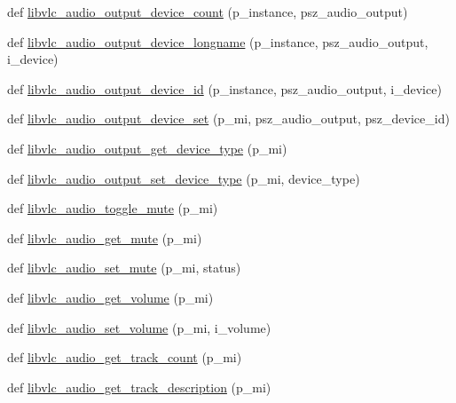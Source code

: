 \begin{DoxyCompactItemize}
def \hyperlink{namespacesrc_1_1lib_1_1vlc_a1e3a4ab8dbece4487c291bbee2345c6c}{libvlc\+\_\+audio\+\_\+output\+\_\+device\+\_\+count} (p\+\_\+instance, psz\+\_\+audio\+\_\+output)
\item 
def \hyperlink{namespacesrc_1_1lib_1_1vlc_add2e127d4a454dd4ab58cc9622f915f6}{libvlc\+\_\+audio\+\_\+output\+\_\+device\+\_\+longname} (p\+\_\+instance, psz\+\_\+audio\+\_\+output, i\+\_\+device)
\item 
def \hyperlink{namespacesrc_1_1lib_1_1vlc_ae3beaf2e0dd800587826423f0abc013e}{libvlc\+\_\+audio\+\_\+output\+\_\+device\+\_\+id} (p\+\_\+instance, psz\+\_\+audio\+\_\+output, i\+\_\+device)
\item 
def \hyperlink{namespacesrc_1_1lib_1_1vlc_a6fb7635a09b87a18485551e017a7c6d4}{libvlc\+\_\+audio\+\_\+output\+\_\+device\+\_\+set} (p\+\_\+mi, psz\+\_\+audio\+\_\+output, psz\+\_\+device\+\_\+id)
\item 
def \hyperlink{namespacesrc_1_1lib_1_1vlc_a153edff43dcb24fcc37843624c85ff63}{libvlc\+\_\+audio\+\_\+output\+\_\+get\+\_\+device\+\_\+type} (p\+\_\+mi)
\item 
def \hyperlink{namespacesrc_1_1lib_1_1vlc_a0eaaa321c6117c22fdc2f684dc529816}{libvlc\+\_\+audio\+\_\+output\+\_\+set\+\_\+device\+\_\+type} (p\+\_\+mi, device\+\_\+type)
\item 
def \hyperlink{namespacesrc_1_1lib_1_1vlc_aca3c5e8f816777ee16725c55a0575da4}{libvlc\+\_\+audio\+\_\+toggle\+\_\+mute} (p\+\_\+mi)
\item 
def \hyperlink{namespacesrc_1_1lib_1_1vlc_a13b60903f4b556ad4fa8a89db3bf30ee}{libvlc\+\_\+audio\+\_\+get\+\_\+mute} (p\+\_\+mi)
\item 
def \hyperlink{namespacesrc_1_1lib_1_1vlc_a5021e934154db194dad54c301cf30954}{libvlc\+\_\+audio\+\_\+set\+\_\+mute} (p\+\_\+mi, status)
\item 
def \hyperlink{namespacesrc_1_1lib_1_1vlc_a9f00931d347473ecfcbfa1e6923374bd}{libvlc\+\_\+audio\+\_\+get\+\_\+volume} (p\+\_\+mi)
\item 
def \hyperlink{namespacesrc_1_1lib_1_1vlc_ac8a58c1e06b64918b3ca2667cb34174e}{libvlc\+\_\+audio\+\_\+set\+\_\+volume} (p\+\_\+mi, i\+\_\+volume)
\item 
def \hyperlink{namespacesrc_1_1lib_1_1vlc_a68177b27d3e010fb52e0e53e2ea01507}{libvlc\+\_\+audio\+\_\+get\+\_\+track\+\_\+count} (p\+\_\+mi)
\item 
def \hyperlink{namespacesrc_1_1lib_1_1vlc_aaff4c9ec8b889eb70901f97f40723d34}{libvlc\+\_\+audio\+\_\+get\+\_\+track\+\_\+description} (p\+\_\+mi)
\item 

\end{DoxyCompactItemize}
